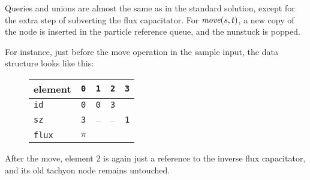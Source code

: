 \documentclass{tufte-handout}
\begin{document}
  Queries and unions are almost the same as in the standard solution, except for the extra step of subverting the flux capacitator.
  For $\emph{move}(s,t)$, a new copy of the node is inserted in the particle reference queue, and the nunstuck is popped.

  \medskip
  
  For instance, just before the move operation in the sample input, the data structure looks like this:

 \begin{figure}[h]
   \begin{minipage}{3cm}
   \end{minipage}
  \qquad
   \begin{minipage}{4cm}
   \begin{tabular}{lcccc}
     element & \texttt{0} & \texttt{1} & \texttt{2} & \texttt{3} \\  \midrule
     \texttt{id}         & \texttt{0} & \texttt{0} & \texttt{3} \\
     \texttt{sz}         & \texttt{3} &  -- & -- & \texttt{1} \\
     \texttt{flux}    & $\pi$ \\ 
   \end{tabular}
   \end{minipage}
 \end{figure}

  After the move, element $2$ is again just a reference to the inverse flux capacitator, and its old tachyon node remains untouched.
\end{document}
